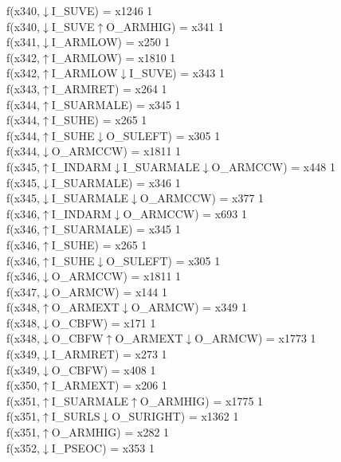 f(x340,$\downarrow$I\_SUVE) = x1246 {1} \\
f(x340,$\downarrow$I\_SUVE$\uparrow$O\_ARMHIG) = x341 {1} \\
f(x341,$\downarrow$I\_ARMLOW) = x250 {1} \\
f(x342,$\uparrow$I\_ARMLOW) = x1810 {1} \\
f(x342,$\uparrow$I\_ARMLOW$\downarrow$I\_SUVE) = x343 {1} \\
f(x343,$\uparrow$I\_ARMRET) = x264 {1} \\
f(x344,$\uparrow$I\_SUARMALE) = x345 {1} \\
f(x344,$\uparrow$I\_SUHE) = x265 {1} \\
f(x344,$\uparrow$I\_SUHE$\downarrow$O\_SULEFT) = x305 {1} \\
f(x344,$\downarrow$O\_ARMCCW) = x1811 {1} \\
f(x345,$\uparrow$I\_INDARM$\downarrow$I\_SUARMALE$\downarrow$O\_ARMCCW) = x448 {1} \\
f(x345,$\downarrow$I\_SUARMALE) = x346 {1} \\
f(x345,$\downarrow$I\_SUARMALE$\downarrow$O\_ARMCCW) = x377 {1} \\
f(x346,$\uparrow$I\_INDARM$\downarrow$O\_ARMCCW) = x693 {1} \\
f(x346,$\uparrow$I\_SUARMALE) = x345 {1} \\
f(x346,$\uparrow$I\_SUHE) = x265 {1} \\
f(x346,$\uparrow$I\_SUHE$\downarrow$O\_SULEFT) = x305 {1} \\
f(x346,$\downarrow$O\_ARMCCW) = x1811 {1} \\
f(x347,$\downarrow$O\_ARMCW) = x144 {1} \\
f(x348,$\uparrow$O\_ARMEXT$\downarrow$O\_ARMCW) = x349 {1} \\
f(x348,$\downarrow$O\_CBFW) = x171 {1} \\
f(x348,$\downarrow$O\_CBFW$\uparrow$O\_ARMEXT$\downarrow$O\_ARMCW) = x1773 {1} \\
f(x349,$\downarrow$I\_ARMRET) = x273 {1} \\
f(x349,$\downarrow$O\_CBFW) = x408 {1} \\
f(x350,$\uparrow$I\_ARMEXT) = x206 {1} \\
f(x351,$\uparrow$I\_SUARMALE$\uparrow$O\_ARMHIG) = x1775 {1} \\
f(x351,$\uparrow$I\_SURLS$\downarrow$O\_SURIGHT) = x1362 {1} \\
f(x351,$\uparrow$O\_ARMHIG) = x282 {1} \\
f(x352,$\downarrow$I\_PSEOC) = x353 {1} \\

